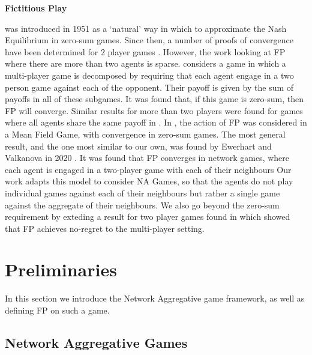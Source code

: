 \documentclass{article}
\theoremstyle{definition}
\begin{document}
\textbf{Fictitious Play}

was introduced in 1951 \cite{Brown1949} as a `natural'
way in which to approximate the Nash Equilibrium in zero-sum games. Since then, a number of proofs of convergence have been determined for 2 player games \cite{Robinson1951, Miyasawa1961, Metrick1994,Berger2007, Monderer1997, Monderer1996}. However, the work looking
at FP where there are more than two agents is sparse. \cite{Sela1999}
considers a game in which a multi-player game is decomposed by
requiring that each agent engage in a two person game against each of
the opponent. Their payoff is given by the sum of payoffs in all of
these subgames. It was found that, if this game is zero-sum, then FP
will converge. Similar results for more than two players were found
for games where all agents share the same payoff in
\cite{Monderer1996}. In \cite{Perrin2020}, the action of FP was
considered in a Mean Field Game, with convergence in zero-sum
games. The most general result, and the one most similar to our own,
was found by Ewerhart and Valkanova in 2020 \cite{Ewerhart2020}. It was found that FP converges in network games, where each
agent is engaged in a two-player game with each of their neighbours
Our work adapts this model to consider NA Games, so that the agents do not play
individual games against each of their neighbours but rather a single
game against the aggregate of their neighbours. We also
go beyond the zero-sum requirement by exteding a result for two player games found in
\cite{Ostrovski2014} which showed that FP achieves no-regret to the
multi-player setting.

\section{Preliminaries}
In this section we introduce the Network Aggregative game framework,
as well as defining FP on such a game.

\subsection{Network Aggregative Games}
\label{sec::NAG}
\end{document}

